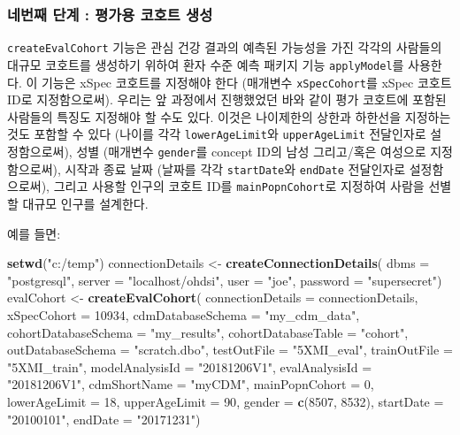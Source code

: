 \documentclass[10.5pt]{book}
\newenvironment{Shaded}{\begin{snugshade}}{\end{snugshade}}
\newcommand{\KeywordTok}[1]{\textcolor[rgb]{0.13,0.29,0.53}{\textbf{#1}}}
\newcommand{\DataTypeTok}[1]{\textcolor[rgb]{0.13,0.29,0.53}{#1}}
\newcommand{\DecValTok}[1]{\textcolor[rgb]{0.00,0.00,0.81}{#1}}
\newcommand{\StringTok}[1]{\textcolor[rgb]{0.31,0.60,0.02}{#1}}
\newcommand{\NormalTok}[1]{#1}
\theoremstyle{definition}
\theoremstyle{definition}
\theoremstyle{definition}
\theoremstyle{remark}
\begin{document}
\subsubsection*{네번째 단계 : 평가용 코호트 생성}\label{----}

\texttt{createEvalCohort} 기능은 관심 건강 결과의 예측된 가능성을 가진
각각의 사람들의 대규모 코호트를 생성하기 위하여 환자 수준 예측 패키지
기능 \texttt{applyModel}를 사용한다. 이 기능은 xSpec 코호트를 지정해야
한다 (매개변수 \texttt{xSpecCohort}를 xSpec 코호트 ID로 지정함으로써).
우리는 앞 과정에서 진행했었던 바와 같이 평가 코호트에 포함된 사람들의
특징도 지정해야 할 수도 있다. 이것은 나이제한의 상한과 하한선을 지정하는
것도 포함할 수 있다 (나이를 각각 \texttt{lowerAgeLimit}와
\texttt{upperAgeLimit} 전달인자로 설정함으로써), 성별 (매개변수
\texttt{gender}를 concept ID의 남성 그리고/혹은 여성으로 지정함으로써),
시작과 종료 날짜 (날짜를 각각 \texttt{startDate}와 \texttt{endDate}
전달인자로 설정함으로써), 그리고 사용할 인구의 코호트 ID를
\texttt{mainPopnCohort}로 지정하여 사람을 선별할 대규모 인구를 설계한다.

예를 들면:

\begin{Shaded}
\begin{Highlighting}[]
\KeywordTok{setwd}\NormalTok{(}\StringTok{"c:/temp"}\NormalTok{)}
\NormalTok{connectionDetails <-}\StringTok{ }\KeywordTok{createConnectionDetails}\NormalTok{(}
  \DataTypeTok{dbms =} \StringTok{"postgresql"}\NormalTok{,}
  \DataTypeTok{server =} \StringTok{"localhost/ohdsi"}\NormalTok{,}
  \DataTypeTok{user =} \StringTok{"joe"}\NormalTok{,}
  \DataTypeTok{password =} \StringTok{"supersecret"}\NormalTok{)}
\NormalTok{evalCohort <-}\StringTok{ }\KeywordTok{createEvalCohort}\NormalTok{(}
  \DataTypeTok{connectionDetails =}\NormalTok{ connectionDetails,}
  \DataTypeTok{xSpecCohort =} \DecValTok{10934}\NormalTok{,}
  \DataTypeTok{cdmDatabaseSchema =} \StringTok{"my_cdm_data"}\NormalTok{,}
  \DataTypeTok{cohortDatabaseSchema =} \StringTok{"my_results"}\NormalTok{,}
  \DataTypeTok{cohortDatabaseTable =} \StringTok{"cohort"}\NormalTok{,}
  \DataTypeTok{outDatabaseSchema =} \StringTok{"scratch.dbo"}\NormalTok{,}
  \DataTypeTok{testOutFile =} \StringTok{"5XMI_eval"}\NormalTok{,}
  \DataTypeTok{trainOutFile =} \StringTok{"5XMI_train"}\NormalTok{,}
  \DataTypeTok{modelAnalysisId =} \StringTok{"20181206V1"}\NormalTok{,}
  \DataTypeTok{evalAnalysisId =} \StringTok{"20181206V1"}\NormalTok{,}
  \DataTypeTok{cdmShortName =} \StringTok{"myCDM"}\NormalTok{,}
  \DataTypeTok{mainPopnCohort =} \DecValTok{0}\NormalTok{,}
  \DataTypeTok{lowerAgeLimit =} \DecValTok{18}\NormalTok{,}
  \DataTypeTok{upperAgeLimit =} \DecValTok{90}\NormalTok{,}
  \DataTypeTok{gender =} \KeywordTok{c}\NormalTok{(}\DecValTok{8507}\NormalTok{, }\DecValTok{8532}\NormalTok{),}
  \DataTypeTok{startDate =} \StringTok{"20100101"}\NormalTok{,}
  \DataTypeTok{endDate =} \StringTok{"20171231"}\NormalTok{)}
\end{Highlighting}
\end{Shaded}
\end{document}
